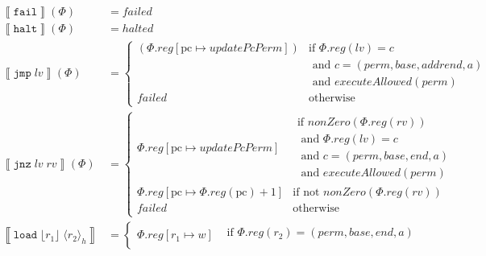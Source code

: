 \documentclass{article}
\newcommand{\update}[2]{[#1 \mapsto #2]}%
\newcommand{\sem}[1]{\left\llbracket #1 \right\rrbracket}
\newcommand{\var}[1]{\mathit{#1}}
\newcommand{\rv}{\var{rv}}
\newcommand{\lv}{\var{lv}}
\newcommand{\pcreg}{\mathrm{pc}}
\newcommand{\addr}{\var{a}}
\newcommand{\start}{\var{base}}
\newcommand{\addrend}{\var{end}}
\newcommand{\reg}{\var{reg}}
\newcommand{\perm}{\var{perm}}
\newcommand{\failed}{\mathit{failed}}
\newcommand{\halted}{\mathit{halted}}
\newcommand{\plainfun}[1]{\mathit{#1}}
\newcommand{\updatePcPerm}[1]{\plainfun{updatePcPerm}}
\newcommand{\executeAllowed}[1]{\plainfun{executeAllowed}(#1)}
\newcommand{\nonZero}[1]{\plainfun{nonZero}(#1)}
\newcommand{\refreg}[1]{\lfloor #1 \rfloor}
\newcommand{\refheap}[1]{\langle #1 \rangle_h}
\newcommand{\fail}{\instr{fail}}
\newcommand{\halt}{\instr{halt}}
\newcommand{\instr}[1]{\mathtt{#1}}
\newcommand{\oneinstr}[2]{\instr{#1} \; #2}
\newcommand{\jmp}[1]{\oneinstr{jmp}{#1}}
\newcommand{\twoinstr}[3]{\instr{#1} \; #2 \; #3}
\newcommand{\jnz}[2]{\twoinstr{jnz}{#1}{#2}}
\newcommand{\load}[2]{\twoinstr{load}{#1}{#2}}
\begin{document}
\begin{align*}
  \sem{\fail}(\Phi)     & = \failed \\
  \sem{\halt}(\Phi)     & = \halted \\
  \sem{\jmp{\lv}}(\Phi) & = \begin{cases}
                            (\Phi.\reg\update{\pcreg}{\updatePcPerm{c}}) & \text{if }\Phi.reg(lv) = c \\
                                                                         & \text{  and }c=(\perm,\start,addrend,\addr)\\
                                                                         & \text{  and }\executeAllowed{\perm}\\
                            \failed & \text{otherwise }
                            \end{cases} \\
  \sem{\jnz{\lv}{\rv}}(\Phi) & = \begin{cases}
                            \Phi.\reg\update{\pcreg}{\updatePcPerm{\var{c}}} &
                            \begin{array}{l}
                              \text{if $\nonZero{\Phi.\reg(\rv)}$} \\ 
                              \text{  and $\Phi.reg(lv) = c$} \\
                              \text{  and $c=(\perm,\start,\addrend,\addr)$}\\
                              \text{  and $\executeAllowed{\perm}$}
                            \end{array}
                            \\ %
                            \Phi.\reg\update{\pcreg}{\Phi.\reg(\pcreg) + 1} & \text{if not $\nonZero{\Phi.\reg(\rv)}$}\\
                            \failed & \text{otherwise }
                            \end{cases} \\
 \sem{\load{\refreg{r_1}}{\refheap{r_2}}} & =
                                 \begin{cases}
                                   \Phi.\reg\update{r_1}{\var{w}} &
                                   \begin{array}{l}
                                     \text{if }\Phi.\reg(r_2) = (\perm,\start,\addrend,\addr)\\

\end{array}
\end{cases}
\end{align*}
\end{document}
